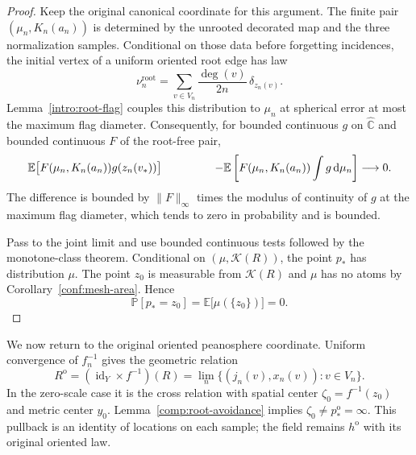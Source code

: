 \documentclass[11pt]{article}
\numberwithin{equation}{section}
\theoremstyle{definition}
\theoremstyle{remark}
\newcommand{\1}{\mathbf 1}
\begin{document}
\begin{proof}
Keep the original canonical coordinate for this argument.  The
finite pair $(\mu_n,K_n(a_n))$ is determined by the unrooted
decorated map and the three normalization samples.  Conditional
on those data before forgetting incidences, the initial vertex
of a uniform oriented root edge has law
\[
 \nu_n^{\mathrm{root}}
   =\sum_{v\in V_n}\frac{\deg(v)}{2n}\,\delta_{z_n(v)}.
\]
Lemma~\ref{intro:root-flag} couples this distribution to $\mu_n$
at spherical error at most the maximum flag diameter.  Consequently,
for bounded continuous $g$ on $\widehat{\mathbb C}$ and bounded continuous $F$
of the root-free pair,
\begin{align*}
 &\mathbb E\bigl[F(\mu_n,K_n(a_n))g(z_n(v_*))\bigr]\
 &\hspace{12mm}-
 \mathbb E\left[F(\mu_n,K_n(a_n))\int g\,\mathrm d\mu_n\right]
 \longrightarrow0.
\end{align*}
The difference is bounded by $\|F\|_\infty$ times the modulus of
continuity of $g$ at the maximum flag diameter, which tends to
zero in probability and is bounded.

Pass to the joint limit and use bounded continuous tests followed
by the monotone-class theorem.  Conditional on
$(\mu,\mathcal K(R))$, the point $p_*$ has distribution $\mu$.
The point $z_0$ is measurable from $\mathcal K(R)$ and $\mu$ has
no atoms by Corollary~\ref{conf:mesh-area}.  Hence
\[
 \mathbb P[p_*=z_0]
   =\mathbb E\bigl[\mu(\{z_0\})\bigr]=0.
\]
\end{proof}

We now return to the original oriented peanosphere coordinate.
Uniform convergence of $f_n^{-1}$ gives the geometric relation
\begin{equation}
 \label{comp:oriented-relation}
 R^{\mathrm o}=(\operatorname{id}_Y\times f^{-1})(R)
  =\lim_n\{(j_n(v),x_n(v)):v\in V_n\}.
\end{equation}
In the zero-scale case it is the cross relation with spatial center
$\zeta_0=f^{-1}(z_0)$ and metric center $y_0$.
Lemma~\ref{comp:root-avoidance} implies
$\zeta_0\ne p_*^{\mathrm o}=\infty$.  This pullback is an identity
of locations on each sample; the field remains $h^{\mathrm o}$ with
its original oriented law.
\end{document}
